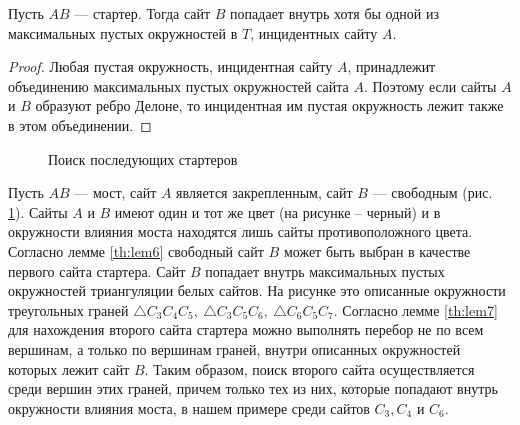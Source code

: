 \documentclass[12pt]{article}
\begin{document}
\begin{lemma}
\label{th:lem7}
Пусть $AB$ --- стартер. Тогда сайт $B$ попадает внутрь хотя бы одной из максимальных пустых окружностей в $T$, инцидентных сайту $A$.
\end{lemma}

\begin{proof}
Любая пустая окружность, инцидентная сайту $A$, принадлежит объединению максимальных пустых окружностей сайта $A$.
Поэтому если сайты $A$ и $B$ образуют ребро Делоне, то инцидентная им пустая окружность лежит также в этом объединении.
\end{proof}

\begin{figure}[htb!]
	\caption{Поиск последующих стартеров}
	\label{pic:nextStarter}
\end{figure}

Пусть $AB$ --- мост, сайт $A$ является закрепленным, сайт $B$ --- свободным (рис. \ref{pic:nextStarter}).
Сайты $A$ и $B$ имеют один и тот же цвет (на рисунке – черный) и в окружности влияния моста находятся лишь сайты противоположного цвета.
Согласно лемме \ref{th:lem6} свободный сайт $B$ может быть выбран в качестве первого сайта стартера.
Сайт $B$ попадает внутрь максимальных пустых окружностей триангуляции белых сайтов.
На рисунке это описанные окружности треугольных граней $\triangle C_3C_4C_5,~\triangle C_3C_5C_6,~\triangle C_6C_5C_7$.
Согласно лемме \ref{th:lem7} для нахождения второго сайта стартера можно выполнять перебор не по всем вершинам,
а только по вершинам граней, внутри описанных окружностей которых лежит сайт $B$.
Таким образом, поиск второго сайта осуществляется среди вершин этих граней,
причем только тех из них, которые попадают внутрь окружности влияния моста,
в нашем примере среди сайтов $C_3, C_4$ и $C_6$.
\end{document}
